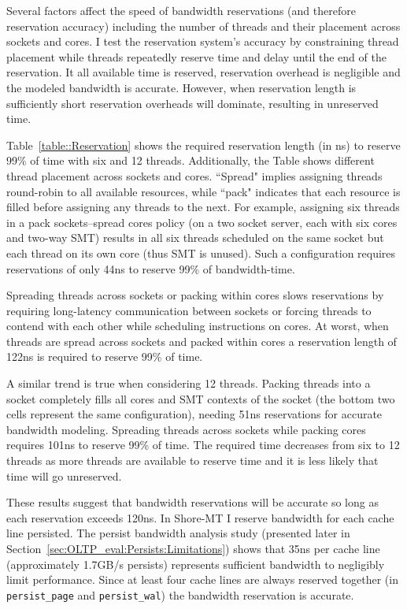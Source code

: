 Several factors affect the speed of bandwidth reservations (and therefore reservation accuracy) including the number of threads and their placement across sockets and cores.
I test the reservation system's accuracy by constraining thread placement while threads repeatedly reserve time and delay until the end of the reservation.
It all available time is reserved, reservation overhead is negligible and the modeled bandwidth is accurate.
However, when reservation length is sufficiently short reservation overheads will dominate, resulting in unreserved time.



Table~\ref{table::Reservation} shows the required reservation length (in ns) to reserve 99\% of time with six and 12 threads.
Additionally, the Table shows different thread placement across sockets and cores.
``Spread" implies assigning threads round-robin to all available resources, while ``pack" indicates that each resource is filled before assigning any threads to the next.
For example, assigning six threads in a pack sockets--spread cores policy (on a two socket server, each with six cores and two-way SMT) results in all six threads scheduled on the same socket but each thread on its own core (thus SMT is unused).
Such a configuration requires reservations of only 44ns to reserve 99\% of bandwidth-time.

Spreading threads across sockets or packing within cores slows reservations by requiring long-latency communication between sockets or forcing threads to contend with each other while scheduling instructions on cores.
At worst, when threads are spread across sockets and packed within cores a reservation length of 122ns is required to reserve 99\% of time.

A similar trend is true when considering 12 threads.
Packing threads into a socket completely fills all cores and SMT contexts of the socket (the bottom two cells represent the same configuration), needing 51ns reservations for accurate bandwidth modeling.
Spreading threads across sockets while packing cores requires 101ns to reserve 99\% of time.
The required time decreases from six to 12 threads as more threads are available to reserve time and it is less likely that time will go unreserved.

These results suggest that bandwidth reservations will be accurate so long as each reservation exceeds 120ns.
In Shore-MT I reserve bandwidth for each cache line persisted.
The persist bandwidth analysis study (presented later in Section~\ref{sec:OLTP_eval:Persists:Limitations}) shows that 35ns per cache line (approximately 1.7GB/s persists) represents sufficient bandwidth to negligibly limit performance.
Since at least four cache lines are always reserved together (in \texttt{persist\_page} and \texttt{persist\_wal}) the bandwidth reservation is accurate.

